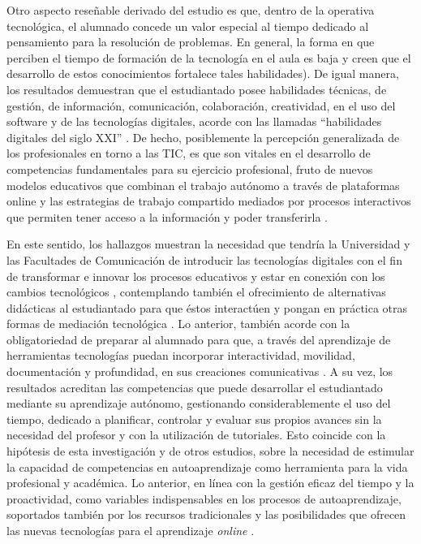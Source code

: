 \documentclass[spanish]{textolivre}
\begin{document}
Otro aspecto reseñable derivado del estudio es que, dentro de la operativa tecnológica, el alumnado concede un valor especial al tiempo dedicado al pensamiento para la resolución de problemas. En general, la forma en que perciben el tiempo de formación de la tecnología en el aula es baja y creen que el desarrollo de estos conocimientos fortalece tales habilidades). De igual manera, los resultados demuestran que el estudiantado posee habilidades técnicas, de gestión, de información, comunicación, colaboración, creatividad, en el uso del software y de las tecnologías digitales, acorde con las llamadas “habilidades digitales del siglo XXI” \cite{van_laar_relation_2017}. De hecho, posiblemente la percepción generalizada de los profesionales en torno a las TIC, es que son vitales en el desarrollo de competencias fundamentales para su ejercicio profesional, fruto de nuevos modelos educativos que combinan el trabajo autónomo a través de plataformas online y las estrategias de trabajo compartido mediados por procesos interactivos que permiten tener acceso a la información y poder transferirla \cite{alcala_del_olmo_fernandez_competencias_2020}.

En este sentido, los hallazgos muestran la necesidad que tendría la Universidad y las Facultades de Comunicación de introducir las tecnologías digitales con el fin de transformar e innovar los procesos educativos \cite{urcid_puga_autoaprendizaje_2022} y estar en conexión con los cambios tecnológicos \cite{falco_reconsiderando_2017}, contemplando también el ofrecimiento de alternativas didácticas al estudiantado para que éstos interactúen y pongan en práctica otras formas de mediación tecnológica \cite{pastor-rodriguez_pildoras_2022}. Lo anterior, también acorde con la obligatoriedad de preparar al alumnado para que, a través del aprendizaje de herramientas tecnologías puedan incorporar interactividad, movilidad, documentación y profundidad, en sus creaciones comunicativas \cite{lopez-garcia_mobile_2019}. A su vez, los resultados acreditan las competencias que puede desarrollar el estudiantado mediante su aprendizaje autónomo, gestionando considerablemente el uso del tiempo, dedicado a planificar, controlar y evaluar sus propios avances sin la necesidad del profesor y con la utilización de tutoriales. Esto coincide con la hipótesis de esta investigación y de otros estudios, sobre la necesidad de estimular la capacidad de competencias en autoaprendizaje como herramienta para la vida profesional y académica. Lo anterior, en línea con la gestión eficaz del tiempo y la proactividad, como variables indispensables en los procesos de autoaprendizaje, soportados también por los recursos tradicionales y las posibilidades que ofrecen las nuevas tecnologías para el aprendizaje \textit{online} \cite{medina-labrador_effects_2023}.
\end{document}

